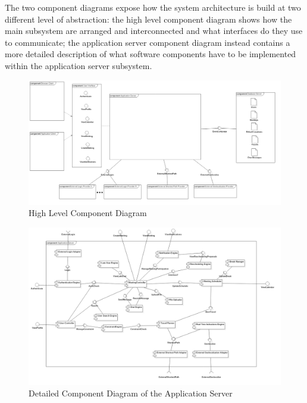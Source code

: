 The two component diagrams expose how the system architecture is build at two different level of abstraction: the high level component diagram shows how the main subsystem are arranged and interconnected and what interfaces do they use to communicate; the application server component diagram instead contains a more detailed description of what software components have to be implemented within the application server subsystem.

\begin{figure}[h]
\centering\includegraphics[width=\textwidth]{Images/UMLDiagrams/HighLevelComponentDiagram.png}
\caption{High Level Component Diagram}
\end{figure}

\begin{figure}[h]
\centering\includegraphics[width=\textwidth]{Images/UMLDiagrams/ApplicationComponentDiagram.png}
\caption{Detailed Component Diagram of the Application Server}
\end{figure}

